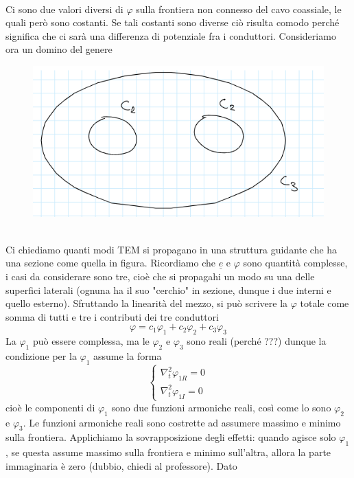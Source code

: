 \documentclass{book}
\begin{document}
        \\ Ci sono due valori diversi di $\varphi$ sulla frontiera non connesso del cavo coassiale, le quali però sono costanti. Se tali costanti sono diverse ciò risulta comodo perché significa che ci sarà 
        una differenza di potenziale fra i conduttori. \newpage 
        Consideriamo ora un domino del genere
        \begin{figure}[h!]
            \center  
            \includegraphics[width=0.6\linewidth]{img/Chapter_three/Chapt3img8.png}
        \end{figure} \\
        Ci chiediamo quanti modi TEM si propagano in una struttura guidante che ha una sezione come quella in figura. Ricordiamo che $\underline{e}$ e $\varphi$ sono quantità complesse, i casi da considerare sono tre,
        cioè che si propagahi un modo su una delle superfici laterali (ognuna ha il suo "cerchio" in sezione, dunque i due interni e quello esterno). Sfruttando la linearità del mezzo, si può scrivere la $\varphi$ totale come somma 
        di tutti e tre i contributi dei tre conduttori
        \begin{equation}
            \varphi = c_{1}\varphi_{1}+c_{2}\varphi_{2}+c_{3}\varphi_{3}
        \end{equation} 
        La $\varphi_{1}$ può essere complessa, ma le $\varphi_{2}$ e $\varphi_{3}$ sono reali (perché ???) dunque la condizione per la $\varphi_{1}$ assume la forma
        \begin{equation}
            \begin{cases}
                \nabla_{t} ^{2} \varphi_{1R} = 0 \\
                \nabla_{t} ^{2} \varphi_{1I} = 0
            \end{cases}
        \end{equation}
        cioè le componenti di $\varphi_{1}$ sono due funzioni armoniche reali, così come lo sono $\varphi_{2}$ e $\varphi_{3}$. Le funzioni armoniche reali sono costrette ad assumere massimo e minimo sulla frontiera.
        Applichiamo la sovrapposizione degli effetti: quando agisce solo $\varphi_{1}$, se questa assume massimo sulla frontiera e minimo sull'altra, allora la parte immaginaria è zero (dubbio, chiedi al professore). Dato 
\end{document}
